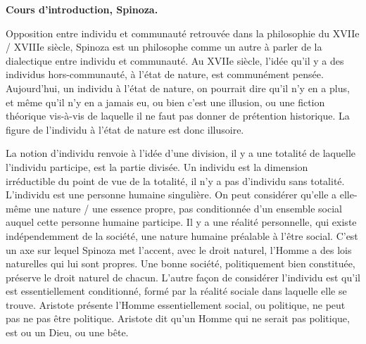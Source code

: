 \documentclass[11pt]{article}
\begin{document}
\bf{Cours d'introduction, Spinoza.}

Opposition entre individu et communauté retrouvée dans la philosophie du XVIIe / XVIIIe siècle, Spinoza est un philosophe comme un autre à parler de la dialectique entre individu et communauté. Au XVIIe siècle, l'idée qu'il y a des individus hors-communauté, à l'état de nature, est communément pensée. Aujourd'hui, un individu à l'état de nature, on pourrait dire qu'il n'y en a plus, et même qu'il n'y en a jamais eu, ou bien c'est une illusion, ou une fiction théorique vis-à-vis de laquelle il ne faut pas donner de prétention historique. La figure de l'individu à l'état de nature est donc illusoire.

La notion d'individu renvoie à l'idée d'une division, il y a une totalité de laquelle l'individu participe, est la partie divisée. Un individu est la dimension irréductible du point de vue de la totalité, il n'y a pas d'individu sans totalité. L'individu est une personne humaine singulière.
On peut considérer qu'elle a elle-même une nature / une essence propre, pas conditionnée d'un ensemble social auquel cette personne humaine participe. Il y a une réalité personnelle, qui existe indépendemment de la société, une nature humaine préalable à l'être social. C'est un axe sur lequel Spinoza met l'accent, avec le droit naturel, l'Homme a des lois naturelles qui lui sont propres. Une bonne société, politiquement bien constituée, préserve le droit naturel de chacun.
L'autre façon de considérer l'individu est qu'il est essentiellement conditionné, formé par la réalité sociale dans laquelle elle se trouve. Aristote présente l'Homme essentiellement social, ou politique, ne peut pas ne pas être politique. Aristote dit qu'un Homme qui ne serait pas politique, est ou un Dieu, ou une bête. 
\end{document}
